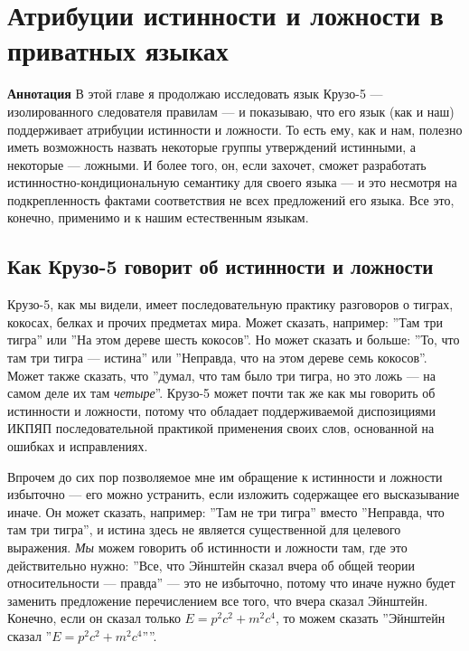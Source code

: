 \documentclass[11pt]{book}
\begin{document}
\chapter{Атрибуции истинности и ложности в приватных языках}

\qquad

\textbf{Аннотация} \quad В этой главе я продолжаю исследовать язык Крузо-5 --- изолированного следователя правилам --- и показываю, что его язык (как и наш) поддерживает атрибуции истинности и ложности. То есть ему, как и нам, полезно иметь возможность назвать некоторые группы утверждений истинными, а некоторые --- ложными. И более того, он, если захочет, сможет разработать истинностно-кондициональную семантику для своего языка --- и это несмотря на подкрепленность фактами соответствия не всех предложений его языка. Все это, конечно, применимо и к нашим естественным языкам.

\qquad

\section{Как Крузо-5 говорит об истинности и ложности}

Крузо-5, как мы видели, имеет последовательную практику разговоров о тиграх, кокосах, белках и прочих предметах мира. Может сказать, например: ''Там три тигра'' или ''На этом дереве шесть кокосов''. Но может сказать и больше: ''То, что там три тигра --- истина'' или ''Неправда, что на этом дереве семь кокосов''. Может также сказать, что ''думал, что там было три тигра, но это ложь --- на самом деле их там \textit{четыре}''. Крузо-5 может почти так же как мы говорить об истинности и ложности, потому что обладает поддерживаемой диспозициями ИКПЯП последовательной практикой применения своих слов, основанной на ошибках и исправлениях.

Впрочем до сих пор позволяемое мне им обращение к истинности и ложности избыточно --- его можно устранить, если изложить содержащее его высказывание иначе. Он может сказать, например: ''Там не три тигра'' вместо ''Неправда, что там три тигра'', и истина здесь не является существенной для целевого выражения. \textit{Мы} можем говорить об истинности и ложности там, где это действительно нужно: ''Все, что Эйнштейн сказал вчера об общей теории относительности --- правда'' --- это не избыточно, потому что иначе нужно будет заменить предложение перечислением все того, что вчера сказал Эйнштейн. Конечно, если он сказал только \begin{math}E = p^2c^2 + m^2c^4\end{math}, то можем сказать ''Эйнштейн сказал ''\begin{math}E = p^2c^2 + m^2c^4\end{math}''''.
\end{document}
